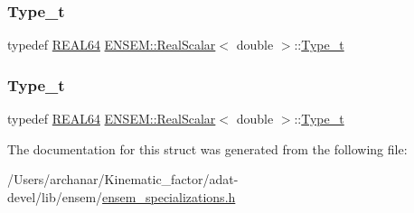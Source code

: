 \mbox{\label{structENSEM_1_1RealScalar_3_01double_01_4_a15549d5ed238882861151026df8e74b3}} 
\subsubsection{\texorpdfstring{Type\_t}{Type\_t}\hspace{0.1cm}{\footnotesize\ttfamily [2/3]}}
{\footnotesize\ttfamily typedef \mbox{\hyperlink{namespaceENSEM_a85b215b9f1f43715aebee01718e25082}{R\+E\+A\+L64}} \mbox{\hyperlink{structENSEM_1_1RealScalar}{E\+N\+S\+E\+M\+::\+Real\+Scalar}}$<$ double $>$\+::\mbox{\hyperlink{structENSEM_1_1RealScalar_3_01double_01_4_a15549d5ed238882861151026df8e74b3}{Type\+\_\+t}}}

\mbox{\label{structENSEM_1_1RealScalar_3_01double_01_4_a15549d5ed238882861151026df8e74b3}} 
\subsubsection{\texorpdfstring{Type\_t}{Type\_t}\hspace{0.1cm}{\footnotesize\ttfamily [3/3]}}
{\footnotesize\ttfamily typedef \mbox{\hyperlink{namespaceENSEM_a85b215b9f1f43715aebee01718e25082}{R\+E\+A\+L64}} \mbox{\hyperlink{structENSEM_1_1RealScalar}{E\+N\+S\+E\+M\+::\+Real\+Scalar}}$<$ double $>$\+::\mbox{\hyperlink{structENSEM_1_1RealScalar_3_01double_01_4_a15549d5ed238882861151026df8e74b3}{Type\+\_\+t}}}



The documentation for this struct was generated from the following file\+:\begin{DoxyCompactItemize}
\item 
/\+Users/archanar/\+Kinematic\+\_\+factor/adat-\/devel/lib/ensem/\mbox{\hyperlink{adat-devel_2lib_2ensem_2ensem__specializations_8h}{ensem\+\_\+specializations.\+h}}\end{DoxyCompactItemize}
